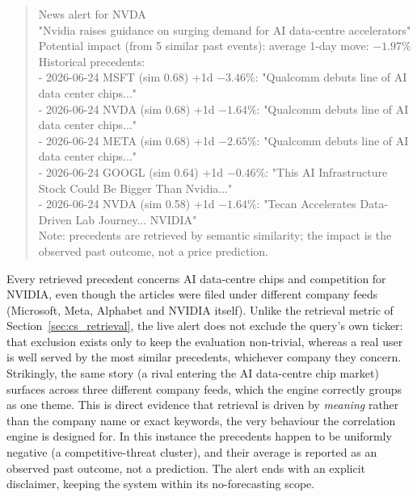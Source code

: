 \begin{quote}\ttfamily\small\raggedright
News alert for NVDA\\
"Nvidia raises guidance on surging demand for AI data-centre accelerators"\\[2pt]
Potential impact (from 5 similar past events): average 1-day move: $-1.97\%$\\
Historical precedents:\\
- 2026-06-24 MSFT (sim 0.68) +1d $-3.46\%$: "Qualcomm debuts line of AI data center chips..."\\
- 2026-06-24 NVDA (sim 0.68) +1d $-1.64\%$: "Qualcomm debuts line of AI data center chips..."\\
- 2026-06-24 META (sim 0.68) +1d $-2.65\%$: "Qualcomm debuts line of AI data center chips..."\\
- 2026-06-24 GOOGL (sim 0.64) +1d $-0.46\%$: "This AI Infrastructure Stock Could Be Bigger Than Nvidia..."\\
- 2026-06-24 NVDA (sim 0.58) +1d $-1.64\%$: "Tecan Accelerates Data-Driven Lab Journey... NVIDIA"\\[2pt]
Note: precedents are retrieved by semantic similarity; the impact is the observed past outcome,
not a price prediction.
\end{quote}

Every retrieved precedent concerns AI data-centre chips and competition for NVIDIA, even though the
articles were filed under different company feeds (Microsoft, Meta, Alphabet and NVIDIA itself). Unlike
the retrieval metric of Section~\ref{sec:cs_retrieval}, the live alert does not exclude the query's own
ticker: that exclusion exists only to keep the evaluation non-trivial, whereas a real user is well served
by the most similar precedents, whichever company they concern. Strikingly, the same story (a rival
entering the AI data-centre chip market) surfaces across three different company feeds, which the engine
correctly groups as one theme. This is direct evidence that
retrieval is driven by \emph{meaning} rather than the company name or exact keywords, the very
behaviour the correlation engine is designed for. In this instance the precedents happen to be uniformly
negative (a competitive-threat cluster), and their average is reported as an observed past outcome, not a
prediction. The alert ends with an explicit disclaimer, keeping the system within its no-forecasting
scope.


